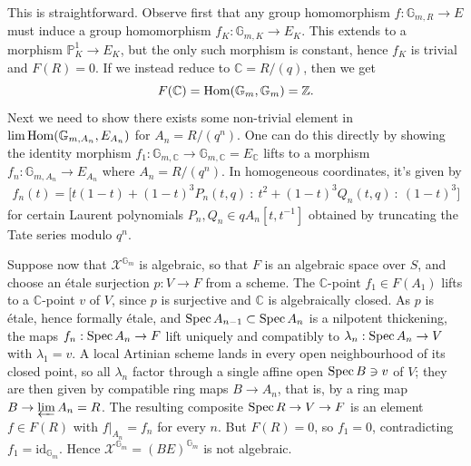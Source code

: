 \begin{example}
  This is straightforward. Observe first that any group homomorphism \(f:\mathbb G_{m,R}\to E\) must induce a group homomorphism \(f_K:\mathbb G_{m,K}\to E_K\). This extends to a morphism \(\mathbb P^1_K\to E_K\), but the only such morphism is constant, hence \(f_K\) is trivial and \(F(R) = 0\). If we instead reduce to \(\mathbb C = R/(q)\), then we get
  \[F(\mathbb C) = \operatorname{Hom}(\mathbb G_m, \mathbb G_m) = \mathbb Z.\]
  Next we need to show there exists some non-trivial element in \(\lim \operatorname{Hom}(\mathbb G_{m,A_n}, E_{A_n})\) for \(A_n = R/(q^n)\). One can do this directly by showing the identity morphism \(f_1:\mathbb G_{m,\mathbb C} \to \mathbb G_{m,\mathbb C}=E_{\mathbb C}\) lifts to a morphism \(f_n:\mathbb G_{m,A_n}\to E_{A_n}\) where \(A_n = R/(q^n)\). In homogeneous coordinates, it's given by
  \begin{align*}
    f_n(t) = \big[t(1-t) + (1 - t)^3P_n(t,q) ~ : ~ t^2 + (1 - t)^3 Q_n(t,q) ~ : ~ (1 - t)^3\big]
  \end{align*}
  for certain Laurent polynomials \(P_n,Q_n \in qA_n[t,t^{-1}]\) obtained by truncating the Tate series modulo \(q^{n}\).

  Suppose now that $\mathcal{X}^{\mathbb{G}_m}$ is algebraic, so that $F$ is an algebraic space over $S$, and choose an \'etale surjection $p:V\to F$ from a scheme. The $\mathbb{C}$-point $f_1\in F(A_1)$ lifts to a $\mathbb{C}$-point $v$ of $V$, since $p$ is surjective and $\mathbb C$ is algebraically closed. As $p$ is \'etale, hence formally \'etale, and $\operatorname{Spec} A_{n-1}\subset \operatorname{Spec} A_n$ is a nilpotent thickening, the maps $f_n:\operatorname{Spec} A_n\to F$ lift uniquely and compatibly to $\lambda_n:\operatorname{Spec} A_n\to V$ with $\lambda_1=v$. A local Artinian scheme lands in every open neighbourhood of its closed point, so all $\lambda_n$ factor through a single affine open $\operatorname{Spec} B\ni v$ of $V$; they are then given by compatible ring maps $B\to A_n$, that is, by a ring map $B\to\varprojlim A_n=R$. The resulting composite $\operatorname{Spec} R\to V\to F$ is an element $f\in F(R)$ with $f|_{A_n}=f_n$ for every $n$. But $F(R)=0$, so $f_1=0$, contradicting $f_1=\mathrm{id}_{\mathbb{G}_m}$. Hence $\mathcal{X}^{\mathbb{G}_m}=(BE)^{\mathbb{G}_m}$ is not algebraic.
\end{example}

